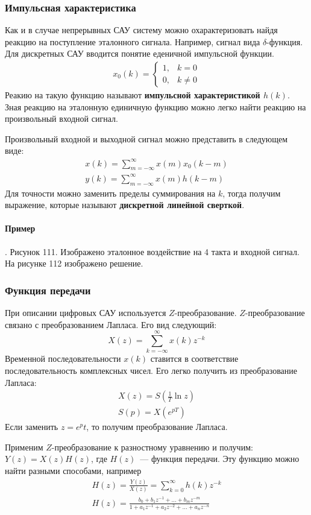 \subsubsection{Импульсная характеристика}
Как и в случае непрерывных САУ систему можно охарактеризовать найдя реакцию на поступление эталонного сигнала. Например, сигнал вида $\delta$-функция. Для дискретных САУ вводится понятие еденичной импульсной функции.
\begin{align*}
	x_0(k)=\left\{\begin{array}{cc}
		1, &k=0 \\
		0, &k\neq0
	\end{array}\right.
\end{align*}
Реакию на такую функцию называют \textbf{импульсной характеристикой $h(k)$}. Зная реакцию на эталонную единичную функцию можно легко найти реакцию на произвольный входной сигнал.

Произвольный входной и выходной сигнал можно представить в следующем виде:
\begin{align*}
	x(k)=\sum\limits^{\infty}_{m=-\infty}x(m)x_0(k-m) \\
	y(k)=\sum\limits^{\infty}_{m=-\infty}x(m)h(k-m)
\end{align*}
Для точности можно заменить пределы суммирования на $k$, тогда получим выражение, которые называют \textbf{дискретной линейной сверткой}. 

\paragraph{Пример}. Рисунок 111. Изображено эталонное воздействие на 4 такта и входной сигнал. На рисунке 112 изображено решение.

\subsubsection{Функция передачи}
При описании цифровых САУ используется $Z$-преобразование. $Z$-преобразование связано с преобразованием Лапласа. Его вид следующий:
$$
	X(z)=\sum\limits^{\infty}_{k=-\infty}x(k)z^{-k}
$$
Временной последовательности $x(k)$ ставится в соответствие последовательность комплексных чисел. Его легко получить из преобразование Лапласа:
\begin{align*}
	X(z)=S(\frac1{T}\ln{}z) \\
	S(p)=X(e^{pT})
\end{align*}
Если заменить $z=e^pt$, то получим преобразование Лапласа.

Применим $Z$-преобразование к разностному уравнению и получим:$Y(z)=X(z)H(z)$, где $H(z)$~--- функция передачи. Эту функцию можно найти разными способами, например
\begin{align*}
	H(z)=\frac{Y(z)}{X(z)}=\sum\limits^{\infty}_{k=0}h(k)z^{-k} \\
	H(z)=\frac{b_0+b_1z^{-1}+\ldots+b_mz^{-m}}{1+a_1z^{-1}+a_2z^{-2}+\ldots+a_nz^{-n}}
\end{align*}

